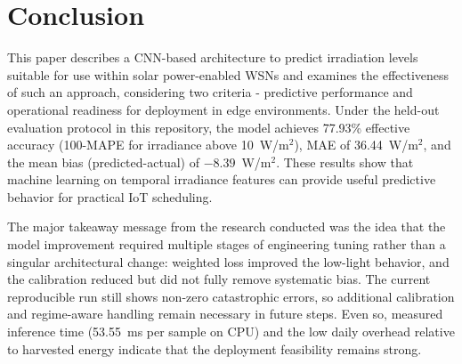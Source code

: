 \documentclass[journal]{IEEEtran}
\begin{document}
\section{Conclusion}
This paper describes a CNN-based architecture to predict irradiation levels suitable for use within solar power-enabled WSNs and examines the effectiveness of such an approach, considering two criteria - predictive performance and operational readiness for deployment in edge environments. Under the held-out evaluation protocol in this repository, the model achieves 77.93\% effective accuracy (100-MAPE for irradiance above 10~W/m$^2$), MAE of 36.44~W/m$^2$, and the mean bias (predicted-actual) of $-8.39$~W/m$^2$. These results show that machine learning on temporal irradiance features can provide useful predictive behavior for practical IoT scheduling.

The major takeaway message from the research conducted was the idea that the model improvement required multiple stages of engineering tuning rather than a singular architectural change: weighted loss improved the low-light behavior, and the calibration reduced but did not fully remove systematic bias. The current reproducible run still shows non-zero catastrophic errors, so additional calibration and regime-aware handling remain necessary in future steps. Even so, measured inference time (53.55~ms per sample on CPU) and the low daily overhead relative to harvested energy indicate that the deployment feasibility remains strong.
\end{document}
